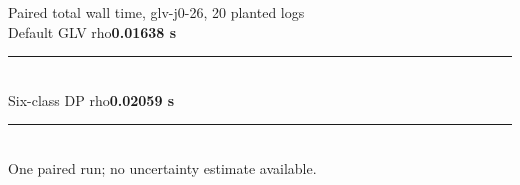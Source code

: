\documentclass[border=8pt]{standalone}
\begin{document}
\begin{minipage}{340pt}
\sffamily\small
Paired total wall time, glv-j0-26, 20 planted logs\\[8pt]
Default GLV rho\quad \textbf{0.01638 s}\\[-2pt]
\textcolor{blue!65!black}{\rule{163.83pt}{14pt}}\\[9pt]
Six-class DP rho\quad \textbf{0.02059 s}\\[-2pt]
\textcolor{orange!85!black}{\rule{205.90pt}{14pt}}\\[9pt]
One paired run; no uncertainty estimate available.
\end{minipage}
\end{document}
